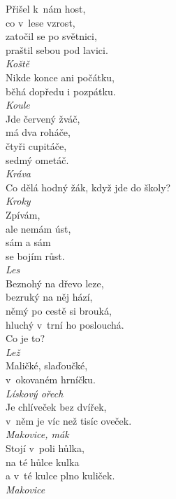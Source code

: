 \begin{multicols}{3}
\noindent
Přišel k~nám host,\\
co v~lese vzrost,\\
zatočil se po světnici,\\
praštil sebou pod lavici.\\[1 mm]
{\sl Koště}\\

\noindent
Nikde konce ani počátku,\\
běhá dopředu i pozpátku.\\[1 mm]
{\sl Koule}\\

\noindent
Jde červený žváč,\\
má dva roháče,\\
čtyři cupitáče,\\
sedmý ometáč.\\[1 mm]
{\sl Kráva}\\

\noindent
Co dělá hodný žák, když jde do školy?\\[1 mm]
{\sl Kroky}\\

\noindent
Zpívám,\\
ale nemám úst,\\
sám a sám\\
se bojím růst.\\[1 mm]
{\sl Les}\\

\noindent
Beznohý na dřevo leze,\\
bezruký na něj hází,\\
němý po cestě si brouká,\\
hluchý v~trní ho poslouchá.\\
Co je to?\\[1 mm]
{\sl Lež}\\

\noindent
Maličké, slaďoučké,\\
v~okovaném hrníčku.\\[1 mm]
{\sl Lískový ořech}\\

\noindent
Je chlíveček bez dvířek,\\
v~něm je víc než tisíc oveček.\\[1 mm]
{\sl Makovice, mák}\\

\noindent
Stojí v~poli hůlka,\\
na té hůlce kulka\\
a v~té kulce plno kuliček.\\[1 mm]
{\sl Makovice}\\


\end{multicols}

